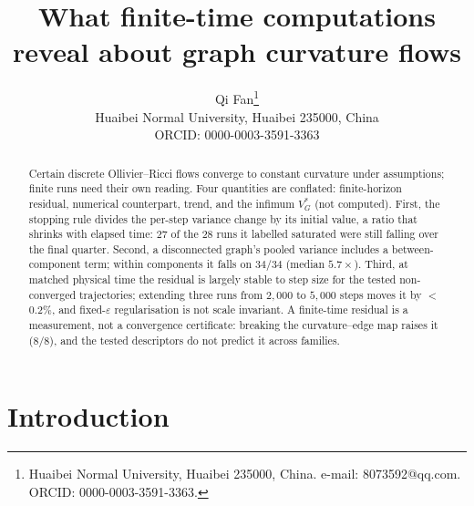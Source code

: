 \documentclass[11pt]{article}
\title{What finite-time computations reveal about graph curvature flows}
\author{%
  Qi Fan\thanks{Huaibei Normal University, Huaibei 235000, China.
  e-mail: 8073592@qq.com. ORCID: 0000-0003-3591-3363.}%
  \\ \small Huaibei Normal University, Huaibei 235000, China%
  \\ \small ORCID: 0000-0003-3591-3363}
\date{}
\begin{document}
\maketitle

\begin{abstract}
Certain discrete {Ollivier}--{Ricci} flows converge to constant curvature
under assumptions; finite runs need their own reading. Four quantities are
conflated: finite-horizon residual, numerical counterpart, trend, and the
infimum $V_G^*$ (not computed). First, the stopping rule divides the per-step
variance change by its initial value, a ratio that shrinks with elapsed time:
$27$ of the $28$ runs it labelled saturated were still falling over the final
quarter. Second, a disconnected graph's pooled variance includes a
between-component term; within components it falls on $34/34$ (median
$5.7\times$). Third, at matched physical time the residual is largely stable to
step size for the tested non-converged trajectories; extending three runs from
$2{,}000$ to $5{,}000$ steps moves it by
$<$$0.2\%$, and fixed-$\varepsilon$ regularisation is not scale invariant. A
finite-time residual is a measurement, not a convergence certificate: breaking
the curvature--edge map raises it ($8/8$), and the tested descriptors do not
predict it across families.
\end{abstract}
\section*{Introduction}
\end{document}
